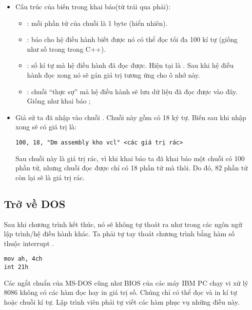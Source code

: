 \documentclass[main.tex]{subfiles}
\begin{document}
\begin{itemize}
    \item Cấu trúc của biến  trong khai báo(từ trái qua phải):
    \begin{itemize}
        \item {}: mỗi phần tử của chuỗi là 1 byte (hiển nhiên).
        \item {}: báo cho hệ điều hành biết được nó có thể đọc tối đa 100 kí tự (giống như số  trong  trong C++).
        \item {}: số kí tự mà hệ điều hành đã đọc được. Hiện tại là . Sau khi hệ điều hành đọc xong nó sẽ gán giá trị tương ứng cho ô nhớ này.
        \item {}: chuỗi ``thực sự'' mà hệ điều hành sẽ lưu dữ liệu đã đọc được vào đây. Giống như khai báo ;
    \end{itemize}
    \item Giả sử ta đã nhập vào chuỗi . Chuỗi này gồm có 18 ký tự. Biến  sau khi nhập xong sẽ có giá trị là:
    \begin{verbatim}
100, 18, "Dm assembly kho vcl" <các giá trị rác>
    \end{verbatim} 
    \par Sau chuỗi này là giá trị rác, vì khi khai báo ta đã khai báo một chuỗi có 100 phần tử, nhưng chuỗi đọc được chỉ có 18 phần tử mà thôi. Do đó, 82 phần tử còn lại sẽ là giá trị rác.
\end{itemize}

\subsection*{Trở về DOS}
Sau khi chương trình kết thúc, nó sẽ không tự thoát ra như trong các ngôn ngữ lập trình/hệ điều hành khác. Ta phải tự tay thoát chương trình bằng hàm số  thuộc interrupt .
\begin{verbatim}
mov ah, 4ch
int 21h
\end{verbatim}

Các ngắt chuẩn của MS-DOS cũng như BIOS của các máy IBM PC chạy vi xử lý 8086 không có các hàm đọc hay in giá trị số. Chúng chỉ có thể đọc và in kí tự hoặc chuỗi kí tự. Lập trình viên phải tự viết các hàm phục vụ những điều này.
\end{document}
